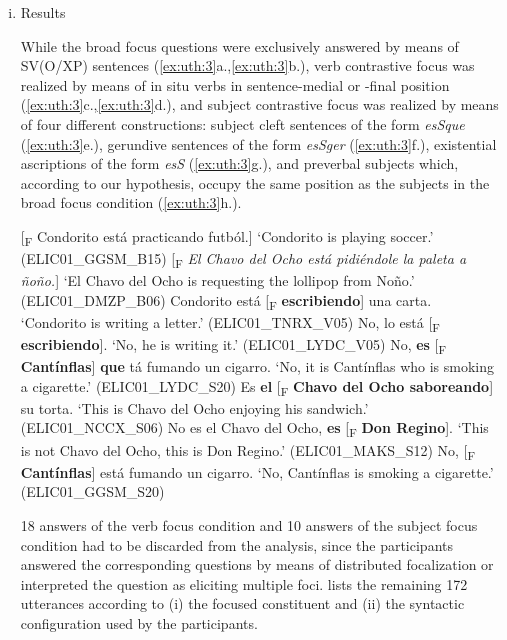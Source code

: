\documentclass[output=paper]{langsci/langscibook}
\begin{document}
\begin{enumerate}[(i)]
\item{Results}

While the broad focus questions were exclusively answered by means of SV(O/XP) sentences (\ref{ex:uth:3}a.,\ref{ex:uth:3}b.), verb contrastive focus was realized by means of in situ verbs in sentence-medial or -final position (\ref{ex:uth:3}c.,\ref{ex:uth:3}d.), and subject contrastive focus was realized by means of four different constructions: subject cleft sentences of the form \textit{esSque} (\ref{ex:uth:3}e.), gerundive sentences of the form \textit{esSger} (\ref{ex:uth:3}f.), existential ascriptions of the form \textit{esS} (\ref{ex:uth:3}g.), and preverbal subjects which, according to our hypothesis, occupy the same position as the subjects in the broad focus condition (\ref{ex:uth:3}h.).


\ea\label{ex:uth:3}
  \ea  {} [\textsubscript{F} Condorito está practicando futból.]
     \glt ‘Condorito is playing soccer.’ (ELIC01\_GGSM\_B15)
    \ex{} [\textsubscript{F} \textit{El Chavo del Ocho está pidiéndole la paleta a ñoño.}]
      \glt       ‘El Chavo del Ocho is requesting the lollipop from Noño.’ (ELIC01\_DMZP\_B06)
    \ex Condorito está [\textsubscript{F} \textbf{escribiendo}] una carta.
      \glt   ‘Condorito is writing a letter.’ (ELIC01\_TNRX\_V05)
    \ex No, lo está [\textsubscript{F} \textbf{escribiendo}].
      \glt ‘No, he is writing it.' (ELIC01\_LYDC\_V05)
    \ex  No, \textbf{es} [\textsubscript{F} \textbf{Cantínflas}] \textbf{que} tá fumando un cigarro.
      \glt    ‘No, it is Cantínflas who is smoking a cigarette.’ (ELIC01\_LYDC\_S20)
    \ex  Es \textbf{el} [\textsubscript{F} \textbf{Chavo del Ocho saboreando}] su torta.
      \glt‘This is Chavo del Ocho enjoying his sandwich.’ (ELIC01\_NCCX\_S06)
    \ex No es el Chavo del Ocho, \textbf{es} [\textsubscript{F} \textbf{Don Regino}].
      \glt ‘This is not Chavo del Ocho, this is Don Regino.’ (ELIC01\_MAKS\_S12)
    \ex  No, [\textsubscript{F} \textbf{Cantínflas}] está fumando un cigarro.
       \glt ‘No, Cantínflas is smoking a cigarette.’ (ELIC01\_GGSM\_S20)
 \z
\z

18 answers of the verb focus condition and 10 answers of the subject focus condition had to be discarded from the analysis, since the participants answered the corresponding questions by means of distributed focalization or interpreted the question as eliciting multiple foci.  lists the remaining 172 utterances according to (i) the focused constituent and (ii) the syntactic configuration used by the participants.

\end{enumerate}
\end{document}

